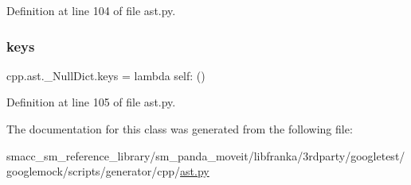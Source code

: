 Definition at line 104 of file ast.\+py.

\mbox{\label{classcpp_1_1ast_1_1__NullDict_abb0b7884aa59bede0a8503dffcd1733f}} 
\subsubsection{\texorpdfstring{keys}{keys}}
{\footnotesize\ttfamily cpp.\+ast.\+\_\+\+Null\+Dict.\+keys = lambda self\+: ()\hspace{0.3cm}{\ttfamily [static]}}



Definition at line 105 of file ast.\+py.



The documentation for this class was generated from the following file\+:\begin{DoxyCompactItemize}
\item 
smacc\+\_\+sm\+\_\+reference\+\_\+library/sm\+\_\+panda\+\_\+moveit/libfranka/3rdparty/googletest/googlemock/scripts/generator/cpp/\hyperlink{ast_8py}{ast.\+py}\end{DoxyCompactItemize}

